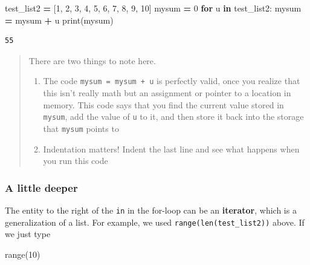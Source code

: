 \documentclass[
  letterpaper,
]{scrbook}
\newenvironment{Shaded}{\begin{snugshade}}{\end{snugshade}}
\newcommand{\BuiltInTok}[1]{#1}
\newcommand{\ControlFlowTok}[1]{\textcolor[rgb]{0.13,0.29,0.53}{\textbf{#1}}}
\newcommand{\DecValTok}[1]{\textcolor[rgb]{0.00,0.00,0.81}{#1}}
\newcommand{\KeywordTok}[1]{\textcolor[rgb]{0.13,0.29,0.53}{\textbf{#1}}}
\newcommand{\NormalTok}[1]{#1}
\newcommand{\OperatorTok}[1]{\textcolor[rgb]{0.81,0.36,0.00}{\textbf{#1}}}
\providecommand{\tightlist}{%
  \setlength{\itemsep}{0pt}\setlength{\parskip}{0pt}}
\begin{document}
\begin{Shaded}
\begin{Highlighting}[]
\NormalTok{test_list2 }\OperatorTok{=}\NormalTok{ [}\DecValTok{1}\NormalTok{, }\DecValTok{2}\NormalTok{, }\DecValTok{3}\NormalTok{, }\DecValTok{4}\NormalTok{, }\DecValTok{5}\NormalTok{, }\DecValTok{6}\NormalTok{, }\DecValTok{7}\NormalTok{, }\DecValTok{8}\NormalTok{, }\DecValTok{9}\NormalTok{, }\DecValTok{10}\NormalTok{]}
\NormalTok{mysum }\OperatorTok{=} \DecValTok{0}
\ControlFlowTok{for}\NormalTok{ u }\KeywordTok{in}\NormalTok{ test_list2:}
\NormalTok{    mysum }\OperatorTok{=}\NormalTok{ mysum }\OperatorTok{+}\NormalTok{ u}
\BuiltInTok{print}\NormalTok{(mysum)}
\end{Highlighting}
\end{Shaded}

\begin{verbatim}
55
\end{verbatim}

\begin{quote}
There are two things to note here.

\begin{enumerate}
\def\labelenumi{\arabic{enumi}.}
\tightlist
\item
  The code \texttt{mysum\ =\ mysum\ +\ u} is perfectly valid, once you realize that this isn't really math but an assignment or pointer to a location in memory. This code says that you find the current value stored in \texttt{mysum}, add the value of \texttt{u} to it, and then store it back into the storage that \texttt{mysum} points to
\item
  Indentation matters! Indent the last line and see what happens when you run this code
\end{enumerate}
\end{quote}

\hypertarget{a-little-deeper}{%
\subsubsection{A little deeper}\label{a-little-deeper}}

The entity to the right of the \texttt{in} in the for-loop can be an \textbf{iterator}, which is a generalization of a list. For example, we used \texttt{range(len(test\_list2))} above. If we just type

\begin{Shaded}
\begin{Highlighting}[]
\BuiltInTok{range}\NormalTok{(}\DecValTok{10}\NormalTok{)}
\end{Highlighting}
\end{Shaded}
\end{document}
